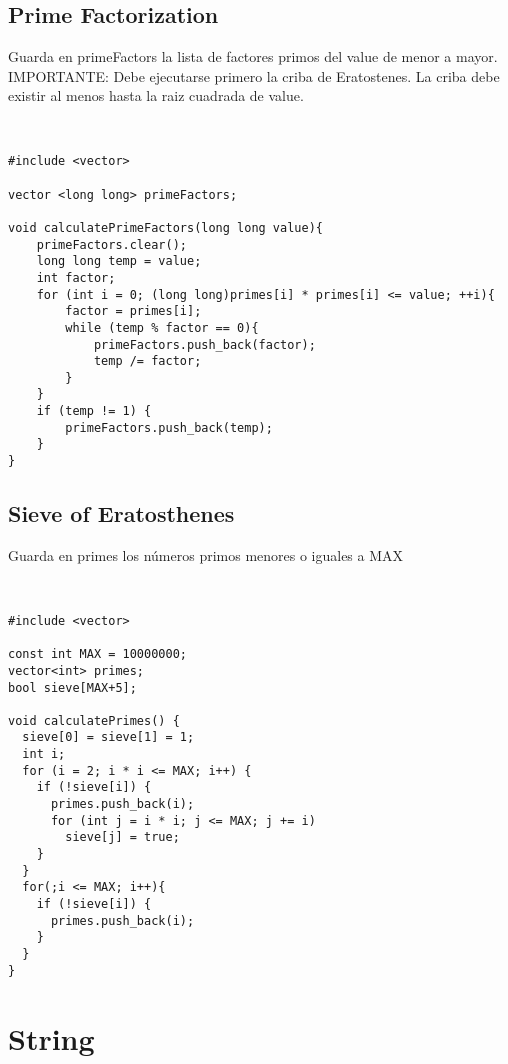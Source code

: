 \documentclass[11pt,letterpaper,twocolumn,twosided]{article}
\begin{document}
\subsection{Prime Factorization}
Guarda en primeFactors la lista de factores primos del value de menor a mayor. IMPORTANTE: Debe ejecutarse primero la criba de Eratostenes.  La criba debe existir al menos hasta la raiz cuadrada de value.
\begin{lstlisting}


#include <vector>

vector <long long> primeFactors;

void calculatePrimeFactors(long long value){
	primeFactors.clear();
	long long temp = value;
	int factor;
	for (int i = 0; (long long)primes[i] * primes[i] <= value; ++i){
		factor = primes[i];
		while (temp % factor == 0){
			primeFactors.push_back(factor);
			temp /= factor;
		}
	}
	if (temp != 1) {
		primeFactors.push_back(temp);
	}
}
\end{lstlisting}

\subsection{Sieve of Eratosthenes}
Guarda en primes los n\'umeros primos menores o iguales a MAX
\begin{lstlisting}


#include <vector>

const int MAX = 10000000;
vector<int> primes;
bool sieve[MAX+5];

void calculatePrimes() {
  sieve[0] = sieve[1] = 1;
  int i;
  for (i = 2; i * i <= MAX; i++) {
    if (!sieve[i]) {
      primes.push_back(i);
      for (int j = i * i; j <= MAX; j += i)
        sieve[j] = true;
    }
  }
  for(;i <= MAX; i++){
  	if (!sieve[i]) {
      primes.push_back(i);
  	}
  }
}
\end{lstlisting}

\section{String}
\end{document}
